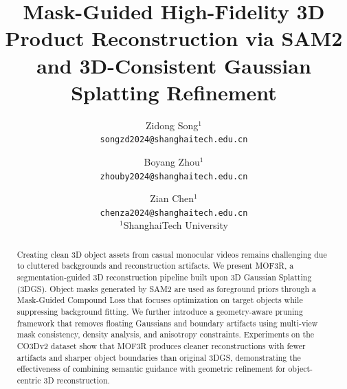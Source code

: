 \documentclass{article}
\title{Mask-Guided High-Fidelity 3D Product Reconstruction via SAM2 and 3D-Consistent Gaussian Splatting Refinement}
\author{%
  Zidong Song$^{1}$\footnotemark[1] \\
  \texttt{songzd2024@shanghaitech.edu.cn}
  \and
  Boyang Zhou$^{1}$\footnotemark[1] \\
  \texttt{zhouby2024@shanghaitech.edu.cn}
  \and
  Zian Chen$^{1}$\footnotemark[1] \\
  \texttt{chenza2024@shanghaitech.edu.cn} \\
  $^{1}$ShanghaiTech University
}
\begin{document}
\renewcommand{\thefootnote}{\fnsymbol{footnote}}

\maketitle

\begin{abstract}
Creating clean 3D object assets from casual monocular videos remains challenging due to cluttered backgrounds and reconstruction artifacts. We present MOF3R, a segmentation-guided 3D reconstruction pipeline built upon 3D Gaussian Splatting (3DGS). Object masks generated by SAM2 are used as foreground priors through a Mask-Guided Compound Loss that focuses optimization on target objects while suppressing background fitting. We further introduce a geometry-aware pruning framework that removes floating Gaussians and boundary artifacts using multi-view mask consistency, density analysis, and anisotropy constraints. Experiments on the CO3Dv2 dataset show that MOF3R produces cleaner reconstructions with fewer artifacts and sharper object boundaries than original 3DGS, demonstrating the effectiveness of combining semantic guidance with geometric refinement for object-centric 3D reconstruction.

\end{abstract}






\nocite{*}



\newpage
\appendix


\end{document}
